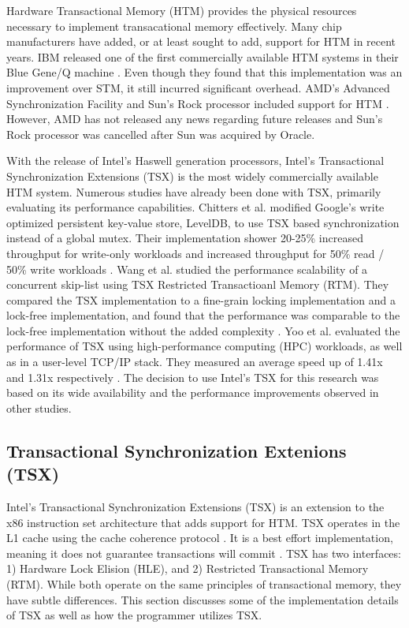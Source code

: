 \documentclass[a4paper]{article}
\begin{document}
\indent 
Hardware Transactional Memory (HTM) provides the physical resources
necessary to implement transacational memory effectively.  Many chip manufacturers
have added, or at least sought to add, support for HTM in recent years.  IBM
released one of the first commercially available HTM systems in their Blue
Gene/Q machine \cite{blue_wang}.  Even though they found that this
implementation was an improvement over STM, it still incurred significant
overhead.  AMD's Advanced Synchronization Facility and Sun's Rock processor
included support for HTM \cite{chung_amd,rock_dice}.  However, AMD has not
released any news regarding future releases and Sun's Rock processor was
cancelled after Sun was acquired by Oracle.
\par

\indent 
With the release of Intel's Haswell generation processors, Intel's
Transactional Synchronization Extensions (TSX) is the most widely commercially
available HTM system.  Numerous studies have already been done with TSX,
primarily evaluating its performance capabilities.  Chitters et al. modified
Google's write optimized persistent key-value store, LevelDB, to use TSX based
synchronization instead of a global mutex.  Their implementation shower 20-25\%
increased throughput for write-only workloads and increased throughput for 50\%
read / 50\% write workloads \cite{chitters_tsx}.  Wang et al. studied the
performance scalability of a concurrent skip-list using TSX Restricted
Transactioanl Memory (RTM).  They compared the TSX implementation to a
fine-grain locking implementation and a lock-free implementation, and found that
the performance was comparable to the lock-free implementation without the added
complexity \cite{wang_tsx}.  Yoo et al. evaluated the performance of TSX using
high-performance computing (HPC) workloads, as well as in a user-level TCP/IP
stack.  They measured an average speed up of 1.41x and 1.31x respectively
\cite{yoo_tsx}.  The decision to use Intel's TSX for this research was based on
its wide availability and the performance improvements observed in other
studies.
\par

\subsection{\textbf{Transactional Synchronization Extenions (TSX)}}

\indent
Intel's Transactional Synchronization Extensions (TSX) is an extension
to the x86 instruction set architecture that adds support for HTM.  TSX operates
in the L1 cache using the cache coherence protocol \cite{intel_opt_man}.  It is
a best effort implementation, meaning it does not guarantee transactions will
commit \cite{intel_prog_ref}.  TSX has two interfaces: 1) Hardware Lock Elision
(HLE), and 2) Restricted Transactional Memory (RTM).  While both operate on the
same principles of transactional memory, they have subtle differences.  This
section discusses some of the implementation details of TSX as well as how the
programmer utilizes TSX.
\par
\end{document}
